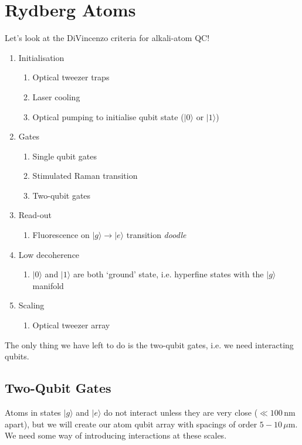 \documentclass[lasers.tex]{subfiles}
\begin{document}
\chapter{Rydberg Atoms}
Let's look at the DiVincenzo criteria for alkali-atom QC!
\begin{enumerate}
    \item Initialisation
        \begin{enumerate}
            \item Optical tweezer traps  
            \item Laser cooling 
            \item Optical pumping to initialise qubit state ($|0\rangle$ or $|1\rangle$) 
        \end{enumerate}
    \item Gates
        \begin{enumerate}
            \item Single qubit gates 
            \item Stimulated Raman transition 
            \item Two-qubit gates 
        \end{enumerate}
    \item Read-out
        \begin{enumerate}
            \item Fluorescence on $|g\rangle\to|e\rangle$ transition 
                \textit{doodle}
        \end{enumerate}
    \item Low decoherence
        \begin{enumerate}
            \item $|0\rangle$ and $|1\rangle$ are both `ground' state, i.e. hyperfine states with the $|g\rangle$ manifold 
        \end{enumerate}
    \item Scaling 
        \begin{enumerate}
            \item Optical tweezer array 
        \end{enumerate}
\end{enumerate}
The only thing we have left to do is the two-qubit gates, i.e. we need interacting qubits. 

\section{Two-Qubit Gates}
Atoms in states $|g\rangle$ and $|e\rangle$ do not interact unless they are very close ($\ll100\,$nm apart), but we will create our atom qubit array with spacings of order $5-10\,\mu$m.
We need some way of introducing interactions at these scales.
\end{document}

